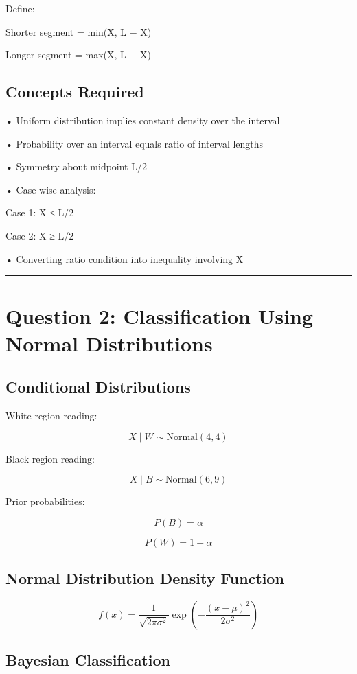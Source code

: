 \documentclass[12pt]{article}
\begin{document}
Define:

Shorter segment = min(X, L − X)

Longer segment = max(X, L − X)

\subsection*{Concepts Required}

• Uniform distribution implies constant density over the interval

• Probability over an interval equals ratio of interval lengths

• Symmetry about midpoint L/2

• Case-wise analysis:

Case 1: X ≤ L/2

Case 2: X ≥ L/2

• Converting ratio condition into inequality involving X

\vspace{0.5cm}
\hrule
\vspace{0.5cm}

\section*{Question 2: Classification Using Normal Distributions}

\subsection*{Conditional Distributions}

White region reading:

\[
X \mid W \sim \text{Normal}(4, 4)
\]

Black region reading:

\[
X \mid B \sim \text{Normal}(6, 9)
\]

Prior probabilities:

\[
P(B) = \alpha
\]

\[
P(W) = 1 − \alpha
\]

\subsection*{Normal Distribution Density Function}

\[
f(x) = \frac{1}{\sqrt{2\pi\sigma^2}} \exp\left( −\frac{(x − μ)^2}{2\sigma^2} \right)
\]

\subsection*{Bayesian Classification}
\end{document}

